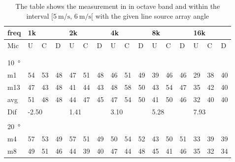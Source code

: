 \begin{table}[H]
\centering
\caption{The table shows the measurement in in octave band and within the interval $[\SI{5}{\meter\per\second},\, \SI{6}{\meter\per\second}[ $ with the given line source array angle}
\begin{tabular}{l|l|l|l|l|l|l|l|l|l|l|l|l|lll}
freq & \multicolumn{3}{l|}{1k} & \multicolumn{3}{l|}{2k} & \multicolumn{3}{l|}{4k} & \multicolumn{3}{l|}{8k} & \multicolumn{3}{l}{16k}                                \\ \hline
Mic  & U      & C      & D     & U      & C      & D     & U      & C      & D     & U      & C      & D     & \multicolumn{1}{l|}{U}  & \multicolumn{1}{l|}{C}  & D  \\ \hline
 & \multicolumn{3}{l|}{} & \multicolumn{3}{l|}{} & \multicolumn{3}{l|}{} & \multicolumn{3}{l|}{} & \multicolumn{3}{l}{}                                \\ 
 \multicolumn{16}{l}{ } \\                             
\SI{10}{\degree}   & \multicolumn{3}{l|}{} & \multicolumn{3}{l|}{} & \multicolumn{3}{l|}{} & \multicolumn{3}{l|}{} & \multicolumn{3}{l}{}   \\  \hline
m1   & 54     &  53    & 48    &  47    &   51   &  48   &  46    &  51    &   49  &  39    &  46    &  46   & \multicolumn{1}{l|}{29} & \multicolumn{1}{l|}{38} &  40\\ 
m13   &  47    &  43    & 48    & 41     &  44    &  43   &  48    &  58    & 50    & 43     &  54    &  47   & \multicolumn{1}{l|}{35} & \multicolumn{1}{l|}{42} &  40\\ \hline
avg & 51     & 48     & 48   &  44    & 47     &  45   &   47   & 54     &  50   &  41    &  50    & 46    & \multicolumn{1}{l|}{32} & \multicolumn{1}{l|}{40} & 40 \\ \hline 
Dif & \multicolumn{3}{l|}{-2.50} & \multicolumn{3}{l|}{1.41} & \multicolumn{3}{l|}{3.10} & \multicolumn{3}{l|}{5.28} & \multicolumn{3}{l}{7.93}      \\ 
 \multicolumn{16}{l}{ } \\                             
\SI{20}{\degree}   & \multicolumn{3}{l|}{} & \multicolumn{3}{l|}{} & \multicolumn{3}{l|}{} & \multicolumn{3}{l|}{} & \multicolumn{3}{l}{}   \\  \hline
m4    & 57     & 53     &  49    &   57   &  51    &  49    &   50   &   54    &  52    &  43     &   50   &  51    & \multicolumn{1}{l|}{33} & \multicolumn{1}{l|}{39} & 39 \\
m8    &  49    &  51   &   46   &   44   &   39   &  40    &   47   &   44    &   48   &    45   &    41  &   46   & \multicolumn{1}{l|}{35} & \multicolumn{1}{l|}{32} & 34 \\

\end{tabular}
\end{table}
